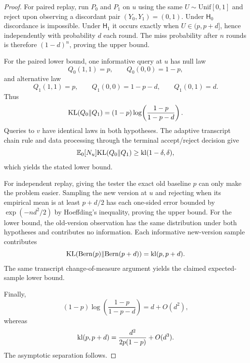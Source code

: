 \begin{proof}
For paired replay, run $P_0$ and $P_1$ on $u$ using the same
$U\sim\mathrm{Unif}[0,1]$ and reject upon observing a discordant pair
$(Y_0,Y_1)=(0,1)$.  Under $\mathsf H_0$ discordance is impossible.  Under
$\mathsf H_1$ it occurs exactly when $U\in(p,p+d]$, hence independently with
probability $d$ each round.  The miss probability after $n$ rounds is therefore
$(1-d)^n$, proving the upper bound.

For the paired lower bound, one informative query at $u$ has null law
\begin{equation}\label{eq:formal-results-012}
Q_0(1,1)=p,
\qquad
Q_0(0,0)=1-p,
\end{equation}
and alternative law
\begin{equation}\label{eq:formal-results-013}
Q_1(1,1)=p,
\qquad
Q_1(0,0)=1-p-d,
\qquad
Q_1(0,1)=d.
\end{equation}
Thus
\begin{equation}\label{eq:formal-results-014}
\mathrm{KL}(Q_0\|Q_1)
=
(1-p)\log\!\left(\frac{1-p}{1-p-d}\right).
\end{equation}
Queries to $v$ have identical laws in both hypotheses.  The adaptive transcript
chain rule and data processing through the terminal accept/reject decision give
\begin{equation}\label{eq:formal-results-015}
\mathbb{E}_0[N_u]\mathrm{KL}(Q_0\|Q_1)
\ge
\mathrm{kl}(1-\delta,\delta),
\end{equation}
which yields the stated lower bound.

For independent replay, giving the tester the exact old baseline $p$ can only make
the problem easier.  Sampling the new version at $u$ and rejecting when its
empirical mean is at least $p+d/2$ has each one-sided error bounded by
$\exp(-nd^2/2)$ by Hoeffding's inequality, proving the upper bound.
For the lower bound, the old-version observation has the same distribution under
both hypotheses and contributes no information.  Each informative new-version
sample contributes
\begin{equation}\label{eq:formal-results-016}
\mathrm{KL}(\mathrm{Bern}(p)\|\mathrm{Bern}(p+d))
=
\mathrm{kl}(p,p+d).
\end{equation}
The same transcript change-of-measure argument yields the claimed expected-sample
lower bound.

Finally,
\begin{equation}\label{eq:formal-results-017}
(1-p)\log\!\left(\frac{1-p}{1-p-d}\right)
=
d+O(d^2),
\end{equation}
whereas
\begin{equation}\label{eq:formal-results-018}
\mathrm{kl}(p,p+d)
=
\frac{d^2}{2p(1-p)}+O(d^3).
\end{equation}
The asymptotic separation follows.
\end{proof}


